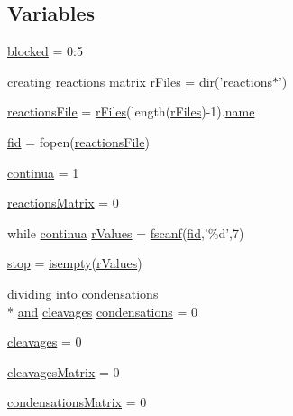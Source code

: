 \subsection*{Variables}
\begin{DoxyCompactItemize}
\item 
\hyperlink{a00024_a1faaaae288fc8ca4ed1751049aa2f84f}{blocked} = 0\-:5
\item 
creating \hyperlink{a00015}{reactions} matrix \hyperlink{a00024_ad75735665492cabd747370126464fddf}{r\-Files} = \hyperlink{a00065_a4ca269cf93df1b512b52174c1a256fe5}{dir}('\hyperlink{a00015}{reactions}$\ast$')
\item 
\hyperlink{a00024_a4c72dba1fe2ee2fbcc699262a8d0c624}{reactions\-File} = \hyperlink{a00024_ad75735665492cabd747370126464fddf}{r\-Files}(length(\hyperlink{a00024_ad75735665492cabd747370126464fddf}{r\-Files})-\/1).\hyperlink{a00021_abbf559a76fab59203496b0847ab9502a}{name}
\item 
\hyperlink{a00024_ae9011d40c6f13e68e6f07156e0da7c5d}{fid} = fopen(\hyperlink{a00024_a4c72dba1fe2ee2fbcc699262a8d0c624}{reactions\-File})
\item 
\hyperlink{a00024_a9c951ebd5bc3f1adce943bee1255f4d6}{continua} = 1
\item 
\hyperlink{a00024_ac52097a2745fcef31eb175d2e9485845}{reactions\-Matrix} = 0
\item 
while \hyperlink{a00024_a9c951ebd5bc3f1adce943bee1255f4d6}{continua} \hyperlink{a00024_a436a6968124e560649654a4abbd9dac6}{r\-Values} = \hyperlink{a00019_a028ac102a731e62fb0a7439381f566c1}{fscanf}(\hyperlink{a00025_ae9011d40c6f13e68e6f07156e0da7c5d}{fid},'\%d',7)
\item 
\hyperlink{a00024_a6bd08e37edf4151f5f6d1fc27a6f227a}{stop} = \hyperlink{a00019_ac10445404f4b83302522defb59e25ef7}{isempty}(\hyperlink{a00024_a436a6968124e560649654a4abbd9dac6}{r\-Values})
\item 
dividing into condensations \\*
\hyperlink{a00022_a170f8acb213f91bf71c77b1d20bceb33}{and} \hyperlink{a00024_a89060c6979e5a4ff7b0985b35f295695}{cleavages} \hyperlink{a00024_ad3aa27d88a7e9d77d8334155860269bb}{condensations} = 0
\item 
\hyperlink{a00024_a89060c6979e5a4ff7b0985b35f295695}{cleavages} = 0
\item 
\hyperlink{a00024_a1a691fb4f955887edfa538e91479fafe}{cleavages\-Matrix} = 0
\item 
\hyperlink{a00024_afaba8eef2f8f4e4dda2e893a19e55a94}{condensations\-Matrix} = 0
\item 

\end{DoxyCompactItemize}
